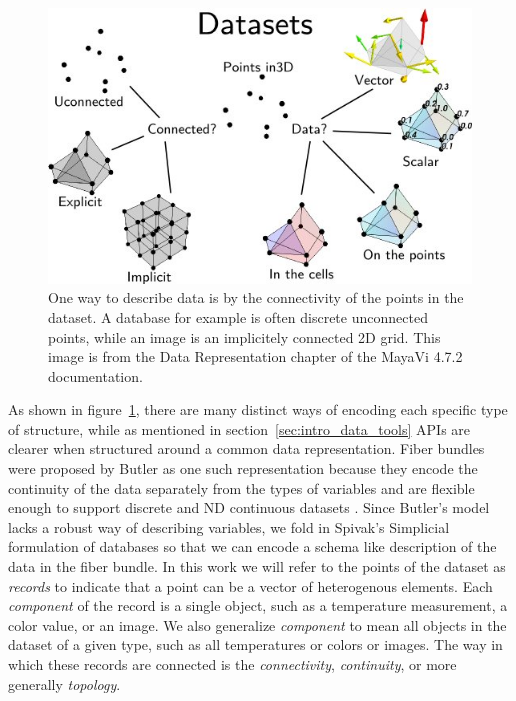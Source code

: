 \documentclass[../main.tex]{subfiles}
\begin{document}
\begin{figure}[H]
    \includegraphics[width=1\textwidth]{figures/intro/dataset_diagram.png}
    \caption{One way to describe data is by the connectivity of the points in the dataset. A database for example is often discrete unconnected points, while an image is an implicitely connected 2D grid. This image is from the Data Representation chapter of the MayaVi 4.7.2 documentation.\cite{DataRepresentationMayavi}}
    \label{fig:intro_data_format}
\end{figure}
As shown in figure~\ref{fig:intro_data_format}, there are many distinct ways of encoding each specific type of structure, while as mentioned in section~\ref{sec:intro_data_tools} APIs are clearer when structured around a common data representation. Fiber bundles were proposed by Butler as one such representation because they encode the continuity of the data separately from the types of variables and are flexible enough to support discrete and ND continuous datasets \cite{butlerVisualizationModelBased1989,butlerVectorBundleClassesForm1992}. Since Butler's model lacks a robust way of describing variables, we fold in Spivak's Simplicial formulation of databases \cite{spivakDatabasesAreCategories2010,spivakSIMPLICIALDATABASES} so that we can encode a schema like description of the data in the fiber bundle. In this work we will refer to the points of the dataset as \textit{records} to indicate that a point can be a vector of heterogenous elements. Each \textit{component} of the record is a single object, such as a temperature measurement, a color value, or an image. We also generalize \textit{component} to mean all objects in the dataset of a given type, such as all temperatures or colors or images. The way in which these records are connected is the \textit{connectivity}, \textit{continuity}, or more generally \textit{topology}.
\end{document}
